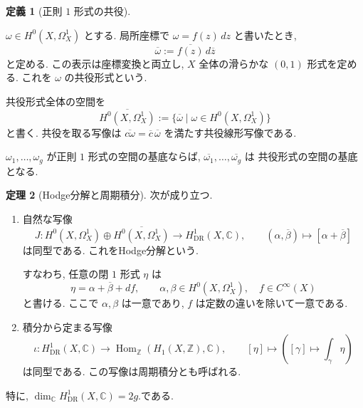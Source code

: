 \documentclass[dvipdfmx,a4paper,11pt]{article} %
\newcommand{\Z}{\mathbb{Z}}
\newcommand{\C}{\mathbb{C}}
\theoremstyle{definition}
\newtheorem{thm}{定理}[section]
\numberwithin{equation}{section}
\newtheorem{dfn}[thm]{定義}
\begin{document}
\begin{dfn}[正則 $1$ 形式の共役]\label{O-M321}

$\omega\in H^0(X,\Omega_X^1)$ とする.
局所座標で $\omega=f(z)\,dz$ と書いたとき, 
\[
\overline\omega:=\overline{f(z)}\,d\overline z
\]
と定める.
この表示は座標変換と両立し, 
$X$ 全体の滑らかな $(0,1)$ 形式を定める.
これを $\omega$ の共役形式という.

共役形式全体の空間を
\[
\overline{H^0(X,\Omega_X^1)}
:=
\{\overline\omega\mid\omega\in H^0(X,\Omega_X^1)\}
\]
と書く.
共役を取る写像は $\overline{c\omega}=\overline c\,\overline\omega$ を満たす共役線形写像である.

$\omega_1,\ldots,\omega_g$ が正則 $1$ 形式の空間の基底ならば, 
$\overline{\omega_1},\ldots,\overline{\omega_g}$ は
共役形式の空間の基底となる.
\end{dfn}


\begin{thm}[Hodge分解と周期積分]\label{O-M323}
次が成り立つ.
\begin{enumerate}
\item
自然な写像
\[
J : 
H^0(X,\Omega_X^1)
\oplus\overline{H^0(X,\Omega_X^1)}
\longrightarrow H_{\mathrm{DR}}^1(X,\C),
\qquad
(\alpha,\overline\beta)\longmapsto[\alpha+\overline\beta]
\]
は同型である. これをHodge分解という. 

すなわち, 任意の閉 $1$ 形式 $\eta$ は
\[
\eta=\alpha+\overline\beta+df,
\qquad
\alpha,\beta\in H^0(X,\Omega_X^1),\quad
f\in C^\infty(X)
\]
と書ける.
ここで $\alpha,\beta$ は一意であり, 
$f$ は定数の違いを除いて一意である.

\item
積分から定まる写像
\[
\iota:H_{\mathrm{DR}}^1(X,\C)
\longrightarrow
\operatorname{Hom}_{\Z}(H_1(X,\Z),\C),
\qquad
[\eta]\longmapsto
\left([\gamma]\longmapsto\int_\gamma\eta\right)
\]
は同型である. この写像は周期積分とも呼ばれる. 
\end{enumerate}

特に, 
\(
\dim_{\C}H_{\mathrm{DR}}^1(X,\C)=2g.
\)である. 
\end{thm}
\end{document}
